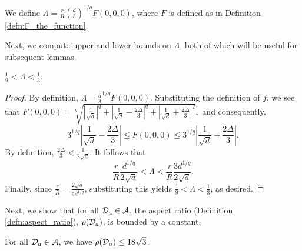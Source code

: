 \begin{defn}\label{defn:big_lambda}
We define $\Lambda = \frac{r}{R}(\frac{d}{3})^{1/q}F(0,0,0)$, where $F$ is defined as in Definition \ref{defn:F_the_function}.
\end{defn}

Next, we compute upper and lower bounds on $\Lambda$, both of which will be useful for subsequent lemmas. 
\begin{lem}\label{lem:lambda_bounds}
$\frac{1}{9} < \Lambda < \frac{1}{3}$. 
\end{lem}

\begin{proof}
By definition, $\Lambda = \frac{d}{3}^{1/q}F(0, 0, 0)$. Substituting the definition of $f$, we see that  $F(0, 0, 0) = \sqrt[q]{|\frac{1}{\sqrt{d}}|^q + |\frac{1}{\sqrt{d}} - \frac{2\Delta}{3}|^q + |\frac{1}{\sqrt{d}} + \frac{2\Delta}{3}|^q},$ and consequently, $$3^{1/q}|\frac{1}{\sqrt{d}} - \frac{2\Delta}{3}| \leq F(0, 0, 0) \leq 3^{1/q}|\frac{1}{\sqrt{d}} + \frac{2\Delta}{3}|.$$ By definition, $\frac{2\Delta}{3} < \frac{1}{2\sqrt{d}}$. It follows that $$\frac{r}{R}\frac{d^{1/q}}{2\sqrt{d}} < \Lambda < \frac{r}{R}\frac{3d^{1/q}}{2\sqrt{d}}.$$ Finally, since $\frac{r}{R} = \frac{2\sqrt{d}}{9d^{1/q}}$, substituting this yields $\frac{1}{9} < \Lambda < \frac{1}{3}$, as desired.
\end{proof}

Next, we show that for all ${\mathcal D}_a \in \mathcal{A}$, the aspect ratio (Definition \ref{defn:aspect_ratio}), $\rho({\mathcal D}_a)$, is bounded by a constant.

\begin{lem}\label{lem:large_margin}
For all ${\mathcal D}_a \in \mathcal{A}$, we have $\rho({\mathcal D}_a) \leq 18\sqrt{3}$. 
\end{lem}

